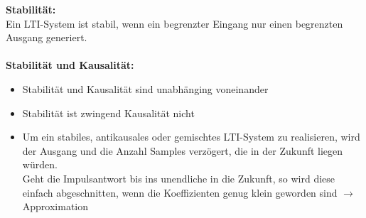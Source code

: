 	\textbf{Stabilität:}\\[0.2cm]
	Ein LTI-System ist stabil, wenn ein begrenzter Eingang nur einen begrenzten Ausgang generiert.\\[0.2cm]
	\\
	
	\textbf{Stabilität und Kausalität:}
	\begin{itemize}
	 \item Stabilität und Kausalität sind unabhänging voneinander
	 \item Stabilität ist zwingend Kausalität nicht
	 \item Um ein stabiles, antikausales oder gemischtes LTI-System zu realisieren, wird der Ausgang und die Anzahl Samples verzögert, die in der Zukunft liegen würden.\\
	 Geht die Impulsantwort bis ins unendliche in die Zukunft, so wird diese einfach abgeschnitten, wenn die Koeffizienten genug klein geworden sind $\rightarrow$ Approximation
	\end{itemize}

	

	


